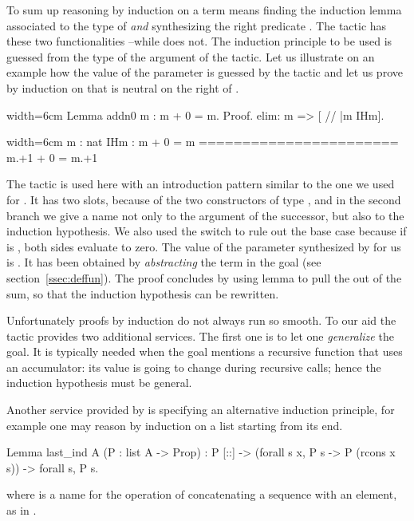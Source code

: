 To sum up reasoning by induction on a term  means
finding the induction lemma associated to the type of 
\emph{and} synthesizing
the right predicate .  The  tactic has these two
functionalities --while  does not. The induction principle
to be used is guessed from the type of the argument of the tactic. Let
us illustrate on an example how the value of the parameter  is
guessed by the  tactic and let us prove by induction on 
that  is neutral on the right of .

\begin{coq}{}{width=6cm}
Lemma addn0 m : m + 0 = m.
Proof.
elim: m => [ // |m IHm].
\end{coq}
\begin{coqout}{}{width=6cm}
m : nat
IHm : m + 0 = m
=======================
m.+1 + 0 = m.+1
\end{coqout}
The  tactic is used here with an introduction pattern similar
to the one we used for . It has two slots, because of the
two constructors of type , and in the second branch we give a
name not only to the argument  of the successor, but also to the
induction hypothesis. We also used the \C{//} switch to rule out the
base case because if
 is , both sides evaluate to zero. The value of the parameter
 synthesized by  for us is
. It has been obtained by
\emph{abstracting} the term  in the goal (see
section~\ref{ssec:deffun}). The proof concludes by using lemma 
to  pull the  out of the sum, so that the induction hypothesis
 can be rewritten.

Unfortunately proofs by induction do not always run so smooth.
To our aid the  tactic provides two additional services.
The first one is to let one \emph{generalize}
the goal.  It is typically needed when the goal mentions a recursive function
that uses an accumulator: its value is going to change during recursive calls;
hence the induction hypothesis must be general.

Another service provided by  is specifying an alternative
induction principle, for example one may reason by induction on
a list starting from its end.

\begin{coq}{}{}
Lemma last_ind A (P : list A -> Prop) :
  P [::] -> (forall s x, P s -> P (rcons x s)) -> forall s, P s.
\end{coq}
where  is a name for the operation of concatenating
a sequence with an element, as in .

